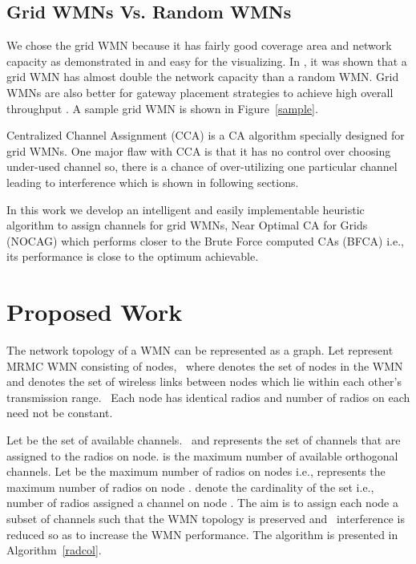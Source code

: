 \documentclass[conference]{IEEEtran}
\begin{document}
\subsection{Grid WMNs Vs. Random WMNs}

We chose the grid WMN because it has fairly good coverage area and network capacity as demonstrated in \cite{Grid,li2008gateway} and  
easy for the visualizing. In \cite{Grid}, it was shown that a grid WMN has almost double the network capacity than a random WMN. 
Grid WMNs are also better for gateway placement strategies to achieve high overall throughput \cite{li2008gateway,kala2015reliable}.
A sample grid WMN is shown in Figure~\ref{sample}. 

Centralized Channel Assignment (CCA) \cite{raniwala2004centralized} is a CA algorithm specially designed for grid WMNs. One major flaw with CCA is that it has no control over
choosing under-used channel so, there is a chance of over-utilizing
one particular channel leading to interference which is shown in following sections. 


In this work we develop an intelligent and easily implementable heuristic algorithm to assign channels for grid WMNs, 
Near Optimal CA for Grids (NOCAG) which performs closer to the Brute Force computed CAs (BFCA) i.e., its performance is close to the optimum achievable.

\section{Proposed Work}

The network topology of a WMN can be represented as a graph.
Let  represent MRMC WMN consisting of  nodes, \
where  denotes the set of nodes in the WMN and 
 denotes the set of wireless links between nodes which lie within each other's transmission range. \
Each node has identical radios and number of radios on each need not be constant.


Let  be the set of available channels. \
and  represents the set of channels that are assigned to the radios on  node.
 is the maximum  number of available orthogonal channels.
Let  be the maximum number of radios on nodes i.e.,  represents the maximum number of radios on node .
 denote the cardinality of the set  i.e., number of radios assigned a channel on node .
The aim is to assign each node a subset of channels such that the WMN topology is preserved and \
interference is reduced so as to increase the WMN performance. The algorithm is presented in Algorithm~\ref{radcol}.
\end{document}
